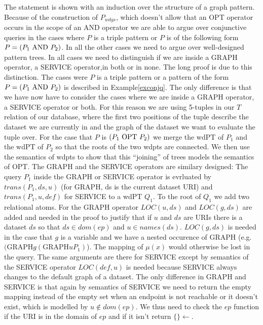 \begin{proofidea}
	The statement is shown with an induction over the
	structure of a graph pattern.
	Because of the construction of $P_{wdgs}$, which doesn't allow
	that an OPT operator occurs in the scope of an AND operator we are able to
	argue over conjunctive queries in the cases where $P$ is a triple pattern or
	$P$ is of the following form $P = (P_1 \mbox{ AND } P_2)$. In all the other cases we
	need to argue over well-designed pattern trees. In all cases we need to
	distinguish if we are inside a GRAPH operator, a SERVICE operator,in
	both or in none. The long proof is due to this distinction.
	The cases were $P$ is a triple pattern or a pattern of the form $P=(P_1 \mbox{ AND }
	P_2)$ is described in Example\ref{exconjq}. The only difference is that we
	have now have to consider the cases where we are inside a GRAPH operator, a SERVICE
	operator or both. For this reason we are using 5-tuples in our $T$ relation
	of our database, where the first two positions of the tuple describe the
	dataset we are currently in and the graph of the dataset we want to evaluate
	the tuple over. For the case that $P$ is $(P_1 \mbox{ OPT } P_2)$ we merge the wdPT
	of $P_1$ and the wdPT of $P_2$ so that the roots of the two wdpts are
	connected. We then use the semantics of wdpts to show that this ``joining''
	of trees models the semantics of OPT. 
	The GRAPH and the SERVICE operators are similary designed:
	The query $P_1$ inside the GRAPH or SERVICE operator is evrluated by
	$trans(P_1,ds,u)$ (for GRAPH, ds is the current dataset URI) and $trans(P_1,u,def)$ for SERVICE to a wdPT $Q_1$. To the root of $Q_1$ we add two relational
	atoms. For the GRAPH operator $LOC(u,ds)$ and $LOC(g,ds)$ are added and
	needed in the proof to justify that if $u$ and $ds$ are URIs there is a
	dataset $ds$ so that $ds \in dom(ep)$ and $u \in names(ds)$. $LOC(g,ds)$ is
	needed in the case that $g$ is a variable and we have a nested occurence of
	GRAPH (e.g. $(\mbox{GRAPH} g (\mbox{GRAPH} u P_1)$). The mapping of $\mu(x)$ would
	otherwise be lost in the query. The same arguments are there for SERVICE
	except by semantics of the SERVICE operator $LOC(def,u)$ is needed because
	SERVICE always changes to the default graph of a dataset.
	The only difference in GRAPH and SERVICE is that again by semantics of
	SERVICE we need to return the empty mapping instead of the empty set when an endpoint is not
	reachable or it doesn't exist, which is modelled by $u \notin dom(ep)$. We
	thus need to check the $ep$ function if the URI is in the domain of $ep$ and
	if it isn't return $\{\} \leftarrow$.
\end{proofidea}

